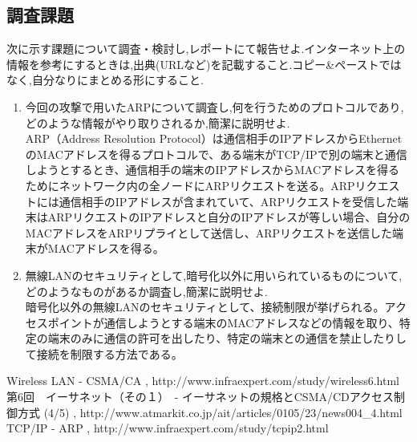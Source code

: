 \documentclass[a4j]{celb-report}
\begin{document}
\subsection{調査課題}
次に示す課題について調査・検討し,レポートにて報告せよ.インターネット上の情報を参考にするときは,出典(URLなど)を記載すること.コピー\&ペーストではなく,自分なりにまとめる形にすること.
\begin{enumerate}
 \renewcommand{\labelenumi}{(\arabic{enumi})}
 \item 今回の攻撃で用いたARPについて調査し,何を行うためのプロトコルであり,どのような情報がやり取りされるか,簡潔に説明せよ.\\
\quad ARP（Address Resolution Protocol）は通信相手のIPアドレスからEthernetのMACアドレスを得るプロトコルで、ある端末がTCP/IPで別の端末と通信しようとするとき、通信相手の端末のIPアドレスからMACアドレスを得るためにネットワーク内の全ノードにARPリクエストを送る。ARPリクエストには通信相手のIPアドレスが含まれていて、ARPリクエストを受信した端末はARPリクエストのIPアドレスと自分のIPアドレスが等しい場合、自分のMACアドレスをARPリプライとして送信し、ARPリクエストを送信した端末がMACアドレスを得る。
 \item 無線LANのセキュリティとして,暗号化以外に用いられているものについて,どのようなものがあるか調査し,簡潔に説明せよ.\\
\quad 暗号化以外の無線LANのセキュリティとして、接続制限が挙げられる。アクセスポイントが通信しようとする端末のMACアドレスなどの情報を取り、特定の端末のみに通信の許可を出したり、特定の端末との通信を禁止したりして接続を制限する方法である。
\end{enumerate}
\newpage
\begin{thebibliography}{9}
 Wireless LAN - CSMA/CA , http://www.infraexpert.com/study/wireless6.html
 第6回　イーサネット（その１）　- イーサネットの規格とCSMA/CDアクセス制御方式 (4/5) , http://www.atmarkit.co.jp/ait/articles/0105/23/news004\_4.html
 TCP/IP - ARP , http://www.infraexpert.com/study/tcpip2.html
\end{thebibliography}
%
\end{document}
